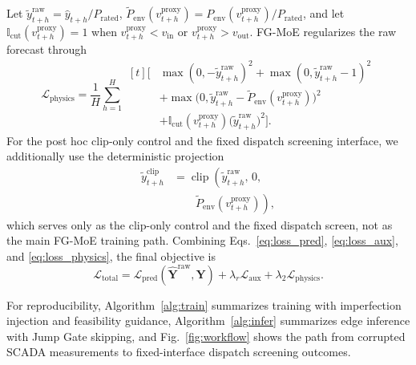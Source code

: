 \documentclass[review,1p,times]{elsarticle}
\begin{document}
Let $\tilde y_{t+h}^{\mathrm{raw}}=\hat y_{t+h}/P_{\mathrm{rated}}$, $\tilde P_{\mathrm{env}}(v_{t+h}^{\mathrm{proxy}})=P_{\mathrm{env}}(v_{t+h}^{\mathrm{proxy}})/P_{\mathrm{rated}}$, and let $\mathbb{I}_{\mathrm{cut}}(v_{t+h}^{\mathrm{proxy}})=1$ when $v_{t+h}^{\mathrm{proxy}}<v_{\mathrm{in}}$ or $v_{t+h}^{\mathrm{proxy}}>v_{\mathrm{out}}$. FG-MoE regularizes the raw forecast through
\begin{equation}
\mathcal{L}_{\text{physics}}=
\frac{1}{H}\sum_{h=1}^{H}
\begin{aligned}[t]
\Big[&
\max(0,-\tilde y_{t+h}^{\mathrm{raw}})^2
+\max(0,\tilde y_{t+h}^{\mathrm{raw}}-1)^2 \\
&+\max\!\big(0,\tilde y_{t+h}^{\mathrm{raw}}-\tilde P_{\mathrm{env}}(v_{t+h}^{\mathrm{proxy}})\big)^2 \\
&+\mathbb{I}_{\mathrm{cut}}(v_{t+h}^{\mathrm{proxy}})\big(\tilde y_{t+h}^{\mathrm{raw}}\big)^2
\Big].
\end{aligned}
\label{eq:loss_physics}
\end{equation}
For the post hoc clip-only control and the fixed dispatch screening interface, we additionally use the deterministic projection
\begin{equation}
\begin{aligned}
\tilde y_{t+h}^{\mathrm{clip}}
&=\operatorname{clip}\!\left(\tilde y_{t+h}^{\mathrm{raw}},\,0,\right.\\
&\qquad\left.\tilde P_{\mathrm{env}}(v_{t+h}^{\mathrm{proxy}})\right),
\end{aligned}
\label{eq:fg_clip}
\end{equation}
which serves only as the clip-only control and the fixed dispatch screen, not as the main FG-MoE training path. Combining Eqs.~\eqref{eq:loss_pred}, \eqref{eq:loss_aux}, and \eqref{eq:loss_physics}, the final objective is
\begin{equation}
\mathcal{L}_{\text{total}}
=\mathcal{L}_{\text{pred}}(\hat{\mathbf{Y}}^{\mathrm{raw}},\mathbf{Y})
+\lambda_r\mathcal{L}_{\text{aux}}
+\lambda_2\mathcal{L}_{\text{physics}}.
\label{eq:loss_total}
\end{equation}


For reproducibility, Algorithm~\ref{alg:train} summarizes training with imperfection injection and feasibility guidance, Algorithm~\ref{alg:infer} summarizes edge inference with Jump Gate skipping, and Fig.~\ref{fig:workflow} shows the path from corrupted SCADA measurements to fixed-interface dispatch screening outcomes.\label{sec:algo_summary}
\end{document}
